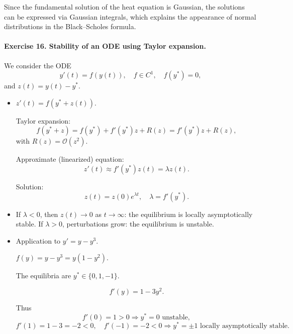 \documentclass[11pt]{article}
\begin{document}
Since the fundamental solution of the heat equation is Gaussian, the solutions can be expressed via Gaussian integrals, which explains the appearance of normal distributions in the Black–Scholes formula.

\bigskip

\paragraph{Exercise 16. Stability of an ODE using Taylor expansion.}

We consider the ODE
\[
y'(t)=f(y(t)),\quad f\in C^1, \quad f(y^\ast)=0,
\]
and \(z(t)=y(t)-y^\ast\).

\begin{itemize}
\item \(z'(t) = f(y^\ast+z(t))\).

Taylor expansion:
\[
f(y^\ast+z) = f(y^\ast)+f'(y^\ast)z+R(z) = f'(y^\ast)z+R(z),
\]
with \(R(z)=\mathcal{O}(z^2)\).

Approximate (linearized) equation:
\[
z'(t)\approx f'(y^\ast)z(t)=\lambda z(t).
\]

Solution:
\[
z(t)=z(0)e^{\lambda t},\quad \lambda=f'(y^\ast).
\]

\item If \(\lambda<0\), then \(z(t)\to 0\) as \(t\to\infty\): the equilibrium is locally asymptotically stable.  
If \(\lambda>0\), perturbations grow: the equilibrium is unstable.

\item Application to \(y' = y-y^3\).

\(f(y)=y-y^3=y(1-y^2)\).

The equilibria are \(y^\ast\in\{0,1,-1\}\).

\[
f'(y) = 1-3y^2.
\]

Thus
\[
f'(0)=1>0 \Rightarrow y^\ast=0 \text{ unstable},
\]
\[
f'(1)=1-3=-2<0,\quad f'(-1)=-2<0
\Rightarrow y^\ast=\pm1 \text{ locally asymptotically stable}.
\]

\end{itemize}
\end{document}
